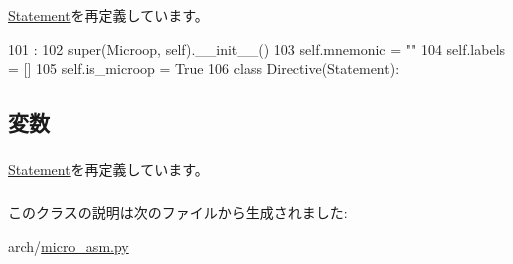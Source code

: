 \hyperlink{classmicro__asm_1_1Statement_ac775ee34451fdfa742b318538164070e}{Statement}を再定義しています。


\begin{DoxyCode}
101                       :
102         super(Microop, self).__init__()
103         self.mnemonic = ""
104         self.labels = []
105         self.is_microop = True
106 
class Directive(Statement):
\end{DoxyCode}


\subsection{変数}
\hypertarget{classmicro__asm_1_1Microop_ad8d639c296a2174eaecfe07681b44d8d}{
\subsubsection[{is\_\-microop}]{}}
\label{classmicro__asm_1_1Microop_ad8d639c296a2174eaecfe07681b44d8d}


\hyperlink{classmicro__asm_1_1Statement_ad8d639c296a2174eaecfe07681b44d8d}{Statement}を再定義しています。\hypertarget{classmicro__asm_1_1Microop_abc325fc13d4194905c1786e24ee447f0}{
\subsubsection[{labels}]{}}
\label{classmicro__asm_1_1Microop_abc325fc13d4194905c1786e24ee447f0}
\hypertarget{classmicro__asm_1_1Microop_aaf1ad8da0f374cbd19a0a177d5280477}{
\subsubsection[{mnemonic}]{}}
\label{classmicro__asm_1_1Microop_aaf1ad8da0f374cbd19a0a177d5280477}


このクラスの説明は次のファイルから生成されました:\begin{DoxyCompactItemize}
\item 
arch/\hyperlink{micro__asm_8py}{micro\_\-asm.py}\end{DoxyCompactItemize}
